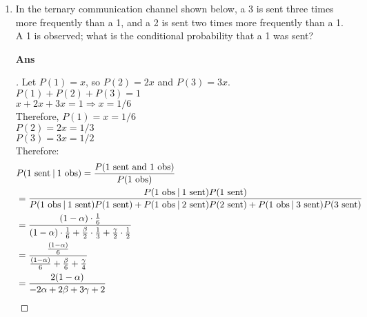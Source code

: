 \documentclass[paper=usletter, fontsize=12pt]{article}
\begin{document}
\begin{enumerate}
        \item In the ternary communication channel shown below, a 3 is sent
        three times more frequently than a 1, and a 2 is sent two times more
        frequently than a 1. A 1 is observed; what is the conditional
        probability that a 1 was sent?
        \item[\textbf{Ans}]
        \begin{proof}[\unskip\nopunct]
            Let $P(\text{1}) = x$, so $P(\text{2}) = 2x$ and $P(\text{3}) =
            3x$. \\
            $P(\text{1}) + P(\text{2}) + P(\text{3}) = 1$ \\
            $x + 2x + 3x = 1 \Rightarrow x = 1/6$ \\
            Therefore, $P(\text{1}) = x = 1/6$ \\
            $P(\text{2}) = 2x = 1/3$ \\
            $P(\text{3}) = 3x = 1/2$ \\
            Therefore:
            \begin{align*}
                & P(\text{1 sent} \:\vert\: \text{1 obs}) = \frac{P(\text{1
                sent and 1 obs})}{P(\text{1 obs})} \\
                & = \frac{P(\text{1 obs} \:\vert\: \text{1 sent})P(\text{1
                sent})}{P(\text{1 obs} \:\vert\: \text{1 sent})P(\text{1
                sent}) + P(\text{1 obs} \:\vert\: \text{2 sent})P(\text{2
                sent}) + P(\text{1 obs} \:\vert\: \text{3 sent})P(\text{3
                sent})} \\
                & = \frac{(1 - \alpha) \cdot \frac{1}{6}}{(1 - \alpha) \cdot \frac{1}{6} + \frac{\beta}{2} \cdot \frac{1}{3} + \frac{\gamma}{2} \cdot \frac{1}{2}} \\
                & = \frac{\frac{(1 - \alpha)}{6}}{\frac{(1 - \alpha)}{6} + \frac{\beta}{6} + \frac{\gamma}{4}} \\
                & = \frac{2(1 - \alpha)}{- 2\alpha + 2\beta + 3\gamma + 2} \qedhere
            \end{align*}
        \end{proof}
        \vspace{0.2in}


\end{enumerate}
\end{document}
